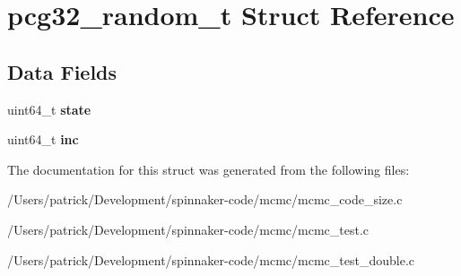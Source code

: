 \hypertarget{structpcg32__random__t}{}\section{pcg32\+\_\+random\+\_\+t Struct Reference}
\label{structpcg32__random__t}
\subsection*{Data Fields}
\begin{DoxyCompactItemize}
\item 
uint64\+\_\+t {\bfseries state}\hypertarget{structpcg32__random__t_ac8ddcc571efb6061ddf9dfbcfffb4cd1}{}\label{structpcg32__random__t_ac8ddcc571efb6061ddf9dfbcfffb4cd1}

\item 
uint64\+\_\+t {\bfseries inc}\hypertarget{structpcg32__random__t_aeadb817a9cc16bd9babfd84847e6f543}{}\label{structpcg32__random__t_aeadb817a9cc16bd9babfd84847e6f543}

\end{DoxyCompactItemize}


The documentation for this struct was generated from the following files\+:\begin{DoxyCompactItemize}
\item 
/\+Users/patrick/\+Development/spinnaker-\/code/mcmc/mcmc\+\_\+code\+\_\+size.\+c\item 
/\+Users/patrick/\+Development/spinnaker-\/code/mcmc/mcmc\+\_\+test.\+c\item 
/\+Users/patrick/\+Development/spinnaker-\/code/mcmc/mcmc\+\_\+test\+\_\+double.\+c\end{DoxyCompactItemize}
